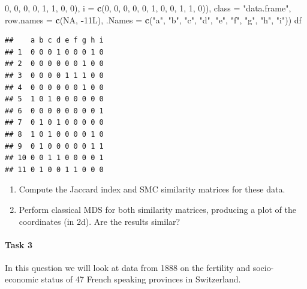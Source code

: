 \documentclass[
]{book}
\newenvironment{Shaded}{\begin{snugshade}}{\end{snugshade}}
\newcommand{\AttributeTok}[1]{\textcolor[rgb]{0.13,0.29,0.53}{#1}}
\newcommand{\ConstantTok}[1]{\textcolor[rgb]{0.56,0.35,0.01}{#1}}
\newcommand{\DecValTok}[1]{\textcolor[rgb]{0.00,0.00,0.81}{#1}}
\newcommand{\FunctionTok}[1]{\textcolor[rgb]{0.13,0.29,0.53}{\textbf{#1}}}
\newcommand{\NormalTok}[1]{#1}
\newcommand{\SpecialCharTok}[1]{\textcolor[rgb]{0.81,0.36,0.00}{\textbf{#1}}}
\newcommand{\StringTok}[1]{\textcolor[rgb]{0.31,0.60,0.02}{#1}}
\theoremstyle{definition}
\theoremstyle{definition}
\theoremstyle{definition}
\theoremstyle{definition}
\theoremstyle{remark}
\begin{document}
\begin{Shaded}
\begin{Highlighting}[]
\DecValTok{0}\NormalTok{, }\DecValTok{0}\NormalTok{, }\DecValTok{0}\NormalTok{, }\DecValTok{0}\NormalTok{, }\DecValTok{1}\NormalTok{, }\DecValTok{1}\NormalTok{, }\DecValTok{0}\NormalTok{, }\DecValTok{0}\NormalTok{), }\AttributeTok{i =} \FunctionTok{c}\NormalTok{(}\DecValTok{0}\NormalTok{, }\DecValTok{0}\NormalTok{, }\DecValTok{0}\NormalTok{, }\DecValTok{0}\NormalTok{, }\DecValTok{0}\NormalTok{, }\DecValTok{1}\NormalTok{, }\DecValTok{0}\NormalTok{, }\DecValTok{0}\NormalTok{, }\DecValTok{1}\NormalTok{, }\DecValTok{1}\NormalTok{, }
\DecValTok{0}\NormalTok{)), }\AttributeTok{class =} \StringTok{"data.frame"}\NormalTok{, }\AttributeTok{row.names =} \FunctionTok{c}\NormalTok{(}\ConstantTok{NA}\NormalTok{, }\SpecialCharTok{{-}}\NormalTok{11L), }\AttributeTok{.Names =} \FunctionTok{c}\NormalTok{(}\StringTok{"a"}\NormalTok{, }
\StringTok{"b"}\NormalTok{, }\StringTok{"c"}\NormalTok{, }\StringTok{"d"}\NormalTok{, }\StringTok{"e"}\NormalTok{, }\StringTok{"f"}\NormalTok{, }\StringTok{"g"}\NormalTok{, }\StringTok{"h"}\NormalTok{, }\StringTok{"i"}\NormalTok{))}
\NormalTok{df}
\end{Highlighting}
\end{Shaded}

\begin{verbatim}
##    a b c d e f g h i
## 1  0 0 0 1 0 0 0 1 0
## 2  0 0 0 0 0 0 1 0 0
## 3  0 0 0 0 1 1 1 0 0
## 4  0 0 0 0 0 0 1 0 0
## 5  1 0 1 0 0 0 0 0 0
## 6  0 0 0 0 0 0 0 0 1
## 7  0 1 0 1 0 0 0 0 0
## 8  1 0 1 0 0 0 0 1 0
## 9  0 1 0 0 0 0 0 1 1
## 10 0 0 1 1 0 0 0 0 1
## 11 0 1 0 0 1 1 0 0 0
\end{verbatim}

\begin{enumerate}
\def\labelenumi{\roman{enumi}.}
\item
  Compute the Jaccard index and SMC similarity matrices for these data.
\item
  Perform classical MDS for both similarity matrices, producing a plot of the coordinates (in 2d). Are the results similar?
\end{enumerate}

\hypertarget{task-3-1}{%
\paragraph*{Task 3}\label{task-3-1}}

In this question we will look at data from 1888 on the fertility and socio-economic status of 47 French speaking provinces in Switzerland.
\end{document}
